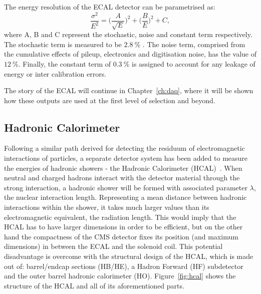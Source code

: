 \hspace{10pt} The energy resolution of the ECAL detector can be parametrised as:
\begin{equation}
    \frac{\sigma^2}{E^2} =\bigg (\frac{A}{\sqrt{E}}\bigg )^2 +\bigg (\frac{B}{E} \bigg )^2 + C,
\end{equation}
where A, B and C represent the stochastic, noise and constant term respectively. The stochastic term is measured to be $2.8~$\% . The noise term, comprised from the cumulative effects of pileup, electronics and digitisation noise, has the value of $12~$\%. Finally, the constant term of $0.3~$\% is assigned to account for any leakage of energy or inter calibration errors. 

\hspace{10pt} The story of the ECAL will continue in Chapter~\ref{ch:daq}, where it will be shown how these outputs are used at the first level of selection and beyond.

\subsection{Hadronic Calorimeter}

\hspace{10pt} Following a similar path derived for detecting the residuum of electromagnetic interactions of particles, a separate detector system has been added to measure the energies of hadronic showers - the Hadronic Calorimeter (HCAL)~\cite{cms:paper,hcal_performance}. When neutral and charged hadrons interact with the detector material through the strong interaction, a hadronic shower will be formed with associated parameter $\lambda$, the nuclear interaction length. Representing a mean distance between hadronic interactions within the shower, it takes much larger values than its electromagnetic equivalent, the radiation length. This would imply that the HCAL has to have larger dimensions in order to be efficient, but on the other hand the compactness of the CMS detector fixes its position (and maximum dimensions) in between the ECAL and the solenoid coil. This potential disadvantage is overcome with the structural design of the HCAL, which is made out of: barrel/endcap sections (HB/HE), a Hadron Forward (HF) subdetector and the outer barrel hadronic calorimeter (HO). Figure~\ref{fig:hcal} shows the structure of the HCAL and all of its aforementioned parts.


